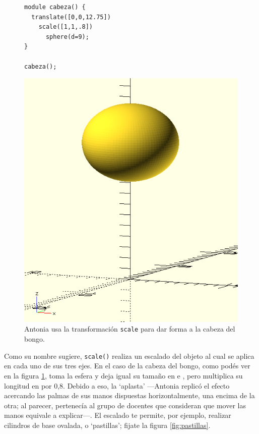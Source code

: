 \begin{figure}[ht]
  \begin{minipage}[]{.5\textwidth}
    \begin{lstlisting}
module cabeza() {
  translate([0,0,12.75])
    scale([1,1,.8]) 
      sphere(d=9);
}

cabeza();
  \end{lstlisting}
  \end{minipage}\hfill
  \begin{minipage}[]{.45\textwidth}
      \centering
      \includegraphics[width=.7\textwidth]{imagenes/cabeza-1}
    \end{minipage}
    \caption{Antonia usa la transformación \lstinline!scale! para dar
      forma a la cabeza del bongo.}
    \label{fig:cabeza-1}
  \end{figure}
  
  \guillemotright Como su nombre sugiere, \lstinline!scale()! realiza
  un escalado del objeto al cual se aplica en cada uno de sus tres
  ejes. En el caso de la cabeza del bongo, como podés ver en la figura
  \ref{fig:cabeza-1}, toma la esfera y deja igual su tamaño en
   e , pero multiplica su longitud en  por
  0,8. Debido a eso, la `aplasta' ---Antonia replicó el efecto
  acercando las palmas de sus manos dispuestas horizontalmente, una
  encima de la otra; al parecer, pertenecía al grupo de docentes que
  consideran que mover las manos equivale a ex\-pli\-\mbox{car---.} El
  escalado te permite, por ejemplo, realizar cilindros de base
  ovalada, o `pastillas'; fijate la figura \ref{fig:pastillas}.

